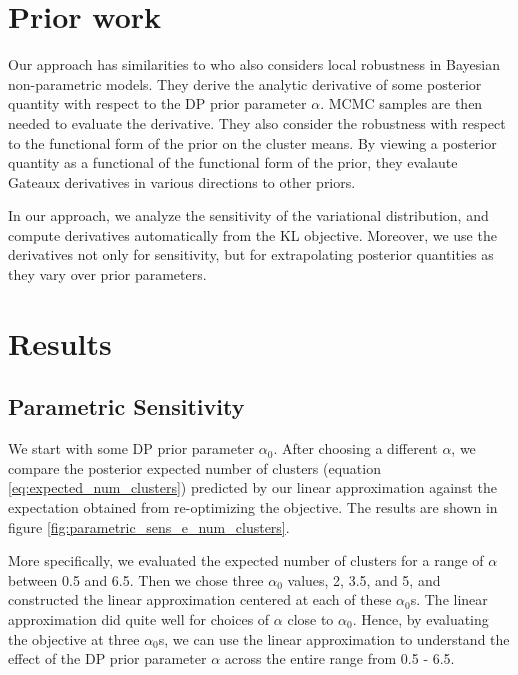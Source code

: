 \documentclass[a4paper]{article}
\begin{document}
\section{Prior work}
Our approach has similarities to \cite{Basu:2000:BNP_robustness} who
also considers local robustness in Bayesian non-parametric models.
They derive the analytic derivative 
of some posterior quantity with respect to the DP prior parameter $\alpha$. MCMC samples are then needed
to evaluate the derivative. They also consider the robustness with respect to the functional form 
of the prior on the cluster means.  By viewing a posterior quantity as a functional of the functional form 
of the prior, they evalaute Gateaux derivatives in various directions to other priors. 

In our approach, we analyze the sensitivity of the variational distribution, and compute derivatives automatically 
from the KL objective. Moreover, we use the derivatives not only for sensitivity, but for extrapolating 
posterior quantities as they vary over prior parameters. 

\section{Results}

\subsection{Parametric Sensitivity}
We start with some DP prior parameter $\alpha_0$. After choosing a different $\alpha$,
we compare the posterior expected number of clusters (equation \ref{eq:expected_num_clusters})
predicted by our linear approximation against the
expectation obtained from re-optimizing the objective. The results are shown in figure
\ref{fig:parametric_sens_e_num_clusters}.

More specifically, we evaluated the expected number of clusters for a range of
$\alpha$ between 0.5 and 6.5.
Then we chose three $\alpha_0$ values, 2, 3.5, and 5, and constructed the linear approximation
centered at each of these $\alpha_0$s. The linear approximation did quite well for choices of $\alpha$
close to $\alpha_0$. Hence, by evaluating the objective at three $\alpha_0$s, we can use
the linear approximation to understand the effect of the DP prior parameter $\alpha$ across the entire
range from 0.5 - 6.5.
\end{document}
